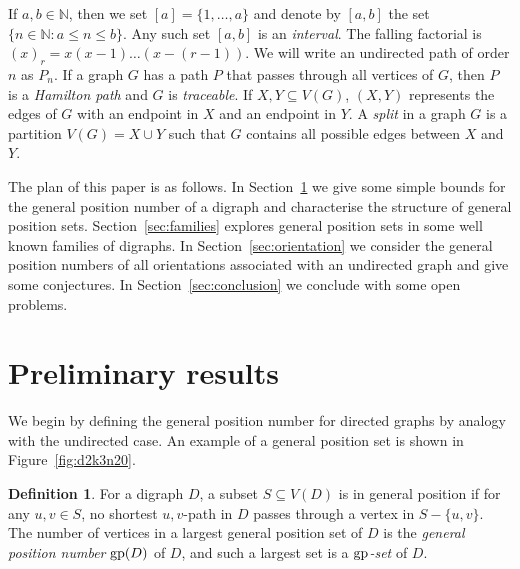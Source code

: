 \documentclass[a4paper,12pt]{article}
\theoremstyle{definition}
\newtheorem{definition}[theorem]{Definition}
\newcommand{\gp}{{\rm gp}}
\begin{document}
	If $a,b \in \mathbb{N}$, then we set $[a] = \{ 1, \ldots ,a\} $ and denote by $[a,b]$ the set $\{ n \in \mathbb{N}: a \leq n \leq b\} $. Any such set $[a,b]$ is an \emph{interval}. The falling factorial is $(x)_r = x(x-1)\ldots (x-(r-1))$. We will write an undirected path of order $n$ as $P_n$. If a graph $G$ has a path $P$ that passes through all vertices of $G$, then $P$ is a \emph{Hamilton path} and $G$ is \emph{traceable}. If $X, Y \subseteq V(G)$, $(X,Y)$ represents the edges of $G$ with an endpoint in $X$ and an endpoint in $Y$. A \emph{split} in a graph $G$ is a partition $V(G) = X \cup Y$ such that $G$ contains all possible edges between $X$ and $Y$.
	
	The plan of this paper is as follows. In Section~\ref{sec:preliminary} we give some simple bounds for the general position number of a digraph and characterise the structure of general position sets. Section~\ref{sec:families} explores general position sets in some well known families of digraphs. In Section~\ref{sec:orientation} we consider the general position numbers of all orientations associated with an undirected graph and give some conjectures. In Section~\ref{sec:conclusion} we conclude with some open problems.
	
	\section{Preliminary results}\label{sec:preliminary}
	
	We begin by defining the general position number for directed graphs by analogy with the undirected case. An example of a general position set is shown in Figure~\ref{fig:d2k3n20}.
	
	\begin{definition}
		For a digraph $D$, a subset $S \subseteq V(D)$ is in general position if for any $u,v \in S$, no shortest $u,v$-path in $D$ passes through a vertex in $S - \{ u,v\} $. The number of vertices in a largest general position set of $D$ is the \emph{general position number} $\gp (D)$ of $D$, and such a largest set is a \emph{$\gp $-set} of $D$.
	\end{definition}
	
	
	
\end{document}
